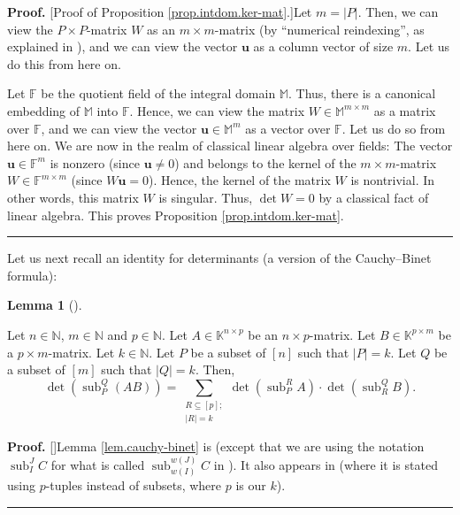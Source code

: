 \documentclass[numbers=enddot,12pt,final,onecolumn,notitlepage]{scrartcl}%
\theoremstyle{definition}
\newtheorem{lem}[theo]{Lemma}
\newenvironment{lemma}[1][]
{\begin{lem}[#1]\begin{leftbar}}
{\end{leftbar}\end{lem}}
\newenvironment{proof}[1][Proof]{\noindent\textbf{#1.} }{\ \rule{0.5em}{0.5em}}
\let\sumnonlimits\sum
\renewcommand{\sum}{\sumnonlimits\limits}
\begin{document}
\begin{proof}
[Proof of Proposition \ref{prop.intdom.ker-mat}.]Let $m=\left\vert
P\right\vert $. Then, we can view the $P\times P$-matrix $W$ as an $m\times
m$-matrix (by \textquotedblleft numerical reindexing\textquotedblright, as
explained in \cite[\S 1]{Grinbe18}), and we can view the vector $\mathbf{u}$
as a column vector of size $m$. Let us do this from here on.

Let $\mathbb{F}$ be the quotient field of the integral domain $\mathbb{M}$.
Thus, there is a canonical embedding of $\mathbb{M}$ into $\mathbb{F}$. Hence,
we can view the matrix $W\in\mathbb{M}^{m\times m}$ as a matrix over
$\mathbb{F}$, and we can view the vector $\mathbf{u}\in\mathbb{M}^{m}$ as a
vector over $\mathbb{F}$. Let us do so from here on. We are now in the realm
of classical linear algebra over fields: The vector $\mathbf{u}\in
\mathbb{F}^{m}$ is nonzero (since $\mathbf{u}\neq0$) and belongs to the kernel
of the $m\times m$-matrix $W\in\mathbb{F}^{m\times m}$ (since $W\mathbf{u}%
=0$). Hence, the kernel of the matrix $W$ is nontrivial. In other words, this
matrix $W$ is singular. Thus, $\det W=0$ by a classical fact of linear
algebra. This proves Proposition \ref{prop.intdom.ker-mat}.
\end{proof}

Let us next recall an identity for determinants (a version of the
Cauchy--Binet formula):

\begin{lemma}
\label{lem.cauchy-binet}Let $n\in\mathbb{N}$, $m\in\mathbb{N}$ and
$p\in\mathbb{N}$. Let $A\in\mathbb{K}^{n\times p}$ be an $n\times p$-matrix.
Let $B\in\mathbb{K}^{p\times m}$ be a $p\times m$-matrix. Let $k\in\mathbb{N}%
$. Let $P$ be a subset of $\left[  n\right]  $ such that $\left\vert
P\right\vert =k$. Let $Q$ be a subset of $\left[  m\right]  $ such that
$\left\vert Q\right\vert =k$. Then,%
\[
\det\left(  \operatorname*{sub}\nolimits_{P}^{Q}\left(  AB\right)  \right)
=\sum_{\substack{R\subseteq\left[  p\right]  ;\\\left\vert R\right\vert
=k}}\det\left(  \operatorname*{sub}\nolimits_{P}^{R}A\right)  \cdot\det\left(
\operatorname*{sub}\nolimits_{R}^{Q}B\right)  .
\]

\end{lemma}

\begin{proof}
[\nopunct]\noindent Lemma \ref{lem.cauchy-binet} is \cite[Corollary
7.251]{detnotes} (except that we are using the notation $\operatorname*{sub}%
\nolimits_{I}^{J}C$ for what is called $\operatorname*{sub}\nolimits_{w\left(
I\right)  }^{w\left(  J\right)  }C$ in \cite{detnotes}). It also appears in
\cite[Chapter I, (19)]{Gantma00} (where it is stated using $p$-tuples instead
of subsets, where $p$ is our $k$).
\end{proof}
\end{document}
